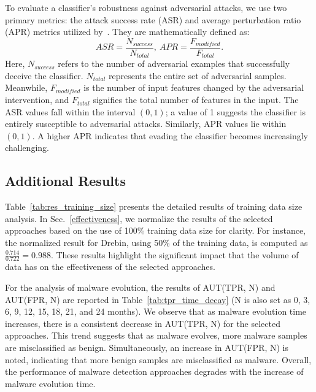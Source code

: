 To evaluate a classifier's robustness against adversarial attacks, we use two primary metrics: the attack success rate (ASR) and average perturbation ratio (APR) metrics utilized by~\cite{li2023black}.
They are mathematically defined as:
$$
ASR = \frac{N_{success}}{N_{total}}, \ APR = \frac{F_{modified}}{F_{total}}.
$$
Here, $N_{success}$ refers to the number of adversarial examples that successfully deceive the classifier.
$N_{total}$ represents the entire set of adversarial samples.
Meanwhile, $F_{modified}$ is the number of input features changed by the adversarial intervention, and $F_{total}$ signifies the total number of features in the input.
The ASR values fall within the interval $(0,1)$; a value of 1 suggests the classifier is entirely susceptible to adversarial attacks.
Similarly, APR values lie within $(0,1)$.
A higher APR indicates that evading the classifier becomes increasingly challenging.


\subsection{Additional Results}
\label{sec:additional_results}
Table~\ref{tab:res_training_size} presents the detailed results of training data size analysis.
In Sec.~\ref{effectiveness}, we normalize the results of the selected approaches based on the use of 100\% training data size for clarity.
For instance, the normalized result for Drebin, using 50\% of the training data, is computed as $\frac{0.714}{0.722} = 0.988$.
These results highlight the significant impact that the volume of data has on the effectiveness of the selected approaches.

For the analysis of malware evolution, the results of AUT(TPR, N) and AUT(FPR, N) are reported in Table~\ref{tab:tpr_time_decay} (N is also set as 0, 3, 6, 9, 12, 15, 18, 21, and 24 months).
We observe that as malware evolution time increases, there is a consistent decrease in AUT(TPR, N) for the selected approaches.
This trend suggests that as malware evolves, more malware samples are misclassified as benign.
Simultaneously, an increase in AUT(FPR, N) is noted, indicating that more benign samples are misclassified as malware.
Overall, the performance of malware detection approaches degrades with the increase of malware evolution time.



